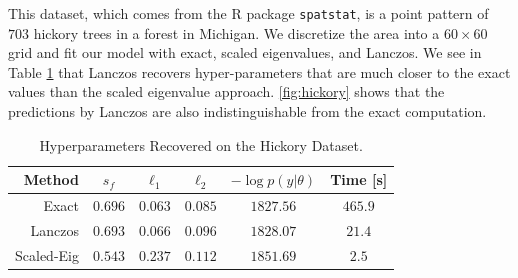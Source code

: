 This dataset, which comes from the R package {\tt spatstat}, is a point pattern
of $703$ hickory trees in a forest in Michigan. We discretize the area into a
$60 \times 60$ grid and fit our model with exact, scaled eigenvalues, and
Lanczos. We see in Table \ref{tab:hickory} that Lanczos recovers
hyper\hyp{}parameters that are much closer to the exact values than the scaled
eigenvalue approach. \cref{fig:hickory} shows that the predictions by Lanczos
are also indistinguishable from the exact computation.

\begin{table}[ht]
  \centering
  \caption{Hyperparameters Recovered on the Hickory Dataset.}\label{tab:hickory}
  \begin{tabular}{r c c c c c}
    \toprule
    Method & $s_f$ & $\ell_1$ & $\ell_2$ & $-\log p(y|\theta)$ & Time [s]\\
    \midrule
    Exact & $0.696$  & $0.063$  & $0.085$ &  $1827.56$ & $465.9$\\
    Lanczos & $0.693$   & $0.066$   & $0.096$ &  $1828.07$ & $21.4$\\
    Scaled\hyp{}Eig & $0.543$  & $0.237$  & $0.112$ &  $1851.69$ & $2.5$\\
    \bottomrule
  \end{tabular}
\end{table}
\vfill

